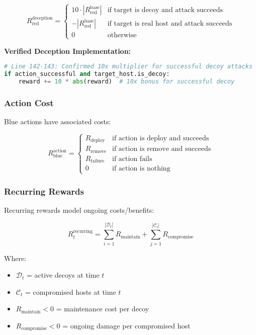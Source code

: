 \documentclass[12pt,a4paper]{article}
\begin{document}
\begin{equation}
R_{\text{red}}^{\text{deception}} = \begin{cases}
10 \cdot |R_{\text{red}}^{\text{base}}| & \text{if target is decoy and attack succeeds} \\
-|R_{\text{red}}^{\text{base}}| & \text{if target is real host and attack succeeds} \\
0 & \text{otherwise}
\end{cases}
\end{equation}

\textbf{Verified Deception Implementation:}
\begin{lstlisting}[language=Python, caption=Deception Reward Logic (cyberwheel/reward/rl\_reward.py)]
# Line 142-143: Confirmed 10x multiplier for successful decoy attacks
if action_successful and target_host.is_decoy:
    reward += 10 * abs(reward)  # 10x bonus for successful decoy
\end{lstlisting}

\subsubsection{Action Cost}
Blue actions have associated costs:

\begin{equation}
R_{\text{blue}}^{\text{action}} = \begin{cases}
R_{\text{deploy}} & \text{if action is deploy and succeeds} \\
R_{\text{remove}} & \text{if action is remove and succeeds} \\
R_{\text{failure}} & \text{if action fails} \\
0 & \text{if action is nothing}
\end{cases}
\end{equation}

\subsubsection{Recurring Rewards}
Recurring rewards model ongoing costs/benefits:

\begin{equation}
R_t^{\text{recurring}} = \sum_{i=1}^{|\mathcal{D}_t|} R_{\text{maintain}} + \sum_{j=1}^{|\mathcal{C}_t|} R_{\text{compromise}}
\end{equation}

Where:
\begin{itemize}
    \item $\mathcal{D}_t$ = active decoys at time $t$
    \item $\mathcal{C}_t$ = compromised hosts at time $t$
    \item $R_{\text{maintain}} < 0$ = maintenance cost per decoy
    \item $R_{\text{compromise}} < 0$ = ongoing damage per compromised host
\end{itemize}
\end{document}
